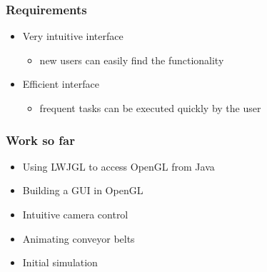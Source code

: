 \documentclass[12pt, aspectratio=169]{beamer} %
\begin{document}
\begin{frame}
  \frametitle{Requirements}
  \begin{itemize}
    \item Very intuitive interface
    \begin{itemize}
      \item new users can easily find the functionality
    \end{itemize}
    \item Efficient interface
    \begin{itemize}
      \item frequent tasks can be executed quickly by the user
    \end{itemize}
  \end{itemize}
\end{frame}

\begin{frame}[<+->]
  \frametitle{Work so far}
  \begin{itemize}
    \item Using LWJGL to access OpenGL from Java
    \item Building a GUI in OpenGL
    \item Intuitive camera control
    \item Animating conveyor belts
    \item Initial simulation
  \end{itemize}
\end{frame}
\end{document}
